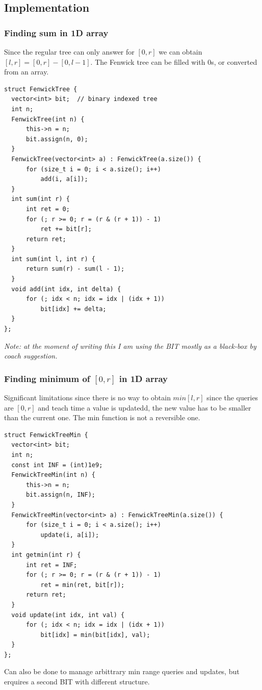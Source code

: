 \documentclass{IEEEtran}
\begin{document}
    \subsection{Implementation}
      \subsubsection{Finding sum in 1D array}
        Since the regular tree can only answer for $[0,r]$ we can obtain $[l,r]=[0,r]-[0,l-1]$. The Fenwick tree can be filled with 0s, or converted from an array.
        \begin{lstlisting}
struct FenwickTree {
  vector<int> bit;  // binary indexed tree
  int n;
  FenwickTree(int n) {
      this->n = n;
      bit.assign(n, 0);
  }
  FenwickTree(vector<int> a) : FenwickTree(a.size()) {
      for (size_t i = 0; i < a.size(); i++)
          add(i, a[i]);
  }
  int sum(int r) {
      int ret = 0;
      for (; r >= 0; r = (r & (r + 1)) - 1)
          ret += bit[r];
      return ret;
  }
  int sum(int l, int r) {
      return sum(r) - sum(l - 1);
  }
  void add(int idx, int delta) {
      for (; idx < n; idx = idx | (idx + 1))
          bit[idx] += delta;
  }
};
        \end{lstlisting}
        \par \textit{Note: at the moment of writing this I am using the BIT mostly as a black-box by coach suggestion.}
      \subsubsection{Finding minimum of $[0,r]$ in 1D array}
        Significant limitations since there is no way to obtain $min[l,r]$ since the queries are $[0,r]$ and teach time a value is updatedd, the new value has to be smaller than the current one. The min function is not a reversible one.
        \begin{lstlisting}
struct FenwickTreeMin {
  vector<int> bit;
  int n;
  const int INF = (int)1e9;
  FenwickTreeMin(int n) {
      this->n = n;
      bit.assign(n, INF);
  }
  FenwickTreeMin(vector<int> a) : FenwickTreeMin(a.size()) {
      for (size_t i = 0; i < a.size(); i++)
          update(i, a[i]);
  }
  int getmin(int r) {
      int ret = INF;
      for (; r >= 0; r = (r & (r + 1)) - 1)
          ret = min(ret, bit[r]);
      return ret;
  }
  void update(int idx, int val) {
      for (; idx < n; idx = idx | (idx + 1))
          bit[idx] = min(bit[idx], val);
  }
};
        \end{lstlisting}
        \par Can also be done to manage arbittrary min range queries and updates, but erquires a second BIT with different structure.
\end{document}
